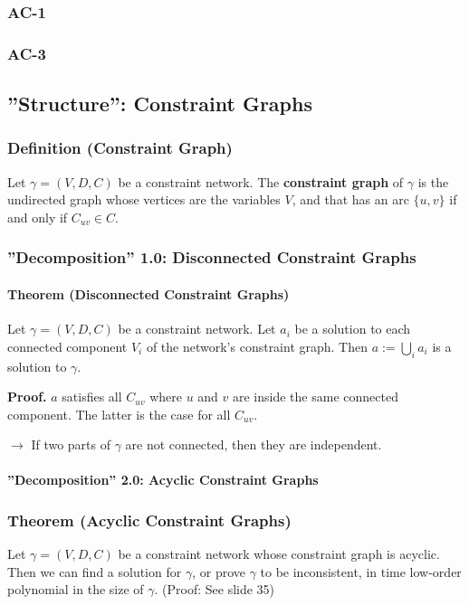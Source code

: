 \documentclass[conference, a4paper]{styles/acmsiggraph}
\newcommand\subsubsubsection{\paragraph}
\begin{document}
        \subsubsection{AC-1}
        \subsubsection{AC-3}
    
    
    
    
    
    
    \subsection{''Structure'': Constraint Graphs}
        \subsubsection{Definition (Constraint Graph)}
            Let $\gamma = (V,D,C)$ be a constraint network.
            The \textbf{constraint graph} of $\gamma$ is the undirected graph whose vertices are the variables $V$, and that has an arc $\{u,v\}$ if and only if $C_{uv} \in C$.
        
        \subsubsection{''Decomposition'' 1.0: Disconnected Constraint Graphs}
            \subsubsubsection{Theorem (Disconnected Constraint Graphs)}
                Let $\gamma = (V,D,C)$ be a constraint network.
                Let $a_i$ be a solution to each connected component $V_i$ of the network's constraint graph.
                Then $a := \bigcup\limits_{i} a_i$ is a solution to $\gamma$.\newline
                
                \textbf{Proof.}
                $a$ satisfies all $C_{uv}$ where $u$ and $v$ are inside the same connected component.
                The latter is the case for all $C_{uv}$.\newline
                
                $\rightarrow$ If two parts of $\gamma$ are not connected, then they are independent.
        
        \subsubsubsection{''Decomposition'' 2.0: Acyclic Constraint Graphs}
            \subsubsection{Theorem (Acyclic Constraint Graphs)}
                Let $\gamma = (V,D,C)$ be a constraint network whose constraint graph is acyclic.
                Then we can find a solution for $\gamma$, or prove $\gamma$ to be inconsistent, in time low-order polynomial in the size of $\gamma$. (Proof: See slide 35)\newline
                
\end{document}
